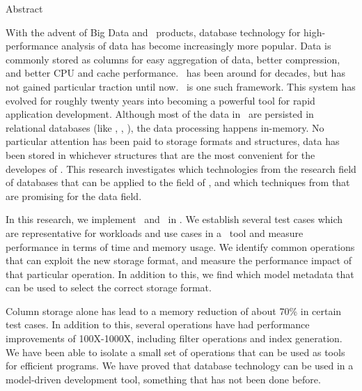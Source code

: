 {\centering

    {\Huge Abstract}
    \vspace{1cm}
    
    With the advent of Big Data and \bd~products, database technology for high-performance analysis of data has become increasingly more popular. Data is commonly stored as columns for easy aggregation of data, better compression, and better CPU and cache performance. \mdd~has been around for decades, but has not gained particular traction until now. \genusSoftware~is one such framework. This system has evolved for roughly twenty years into becoming a powerful tool for rapid application development. Although most of the data in \genusSoftware~are persisted in relational databases (like \oracle, \mssql, \mysql), the data processing happens in-memory. No particular attention has been paid to storage formats and structures, data has been stored in whichever structures that are the most convenient for the developes of \genusSoftware. This research investigates which technologies from the research field of databases that can be applied to the field of \mdd, and which techniques from \mdd that are promising for the data field.

    In this research, we implement \cs~and \de~in \genusSoftware. We establish several test cases which are representative for workloads and use cases in a \mdd~tool and measure performance in terms of time and memory usage. We identify common operations that can exploit the new storage format, and measure the performance impact of that particular operation. In addition to this, we find which model metadata that can be used to select the correct storage format.

    Column storage alone has lead to a memory reduction of about 70\% in certain test cases. In addition to this, several operations have had performance improvements of 100X-1000X, including filter operations and index generation. We have been able to isolate a small set of operations that can be used as tools for efficient programs. We have proved that database technology can be used in a model-driven development tool, something that has not been done before.
   

}
\clearpage
